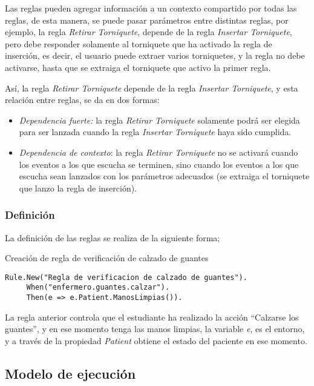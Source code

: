 Las reglas pueden agregar información a un contexto compartido por todas las
reglas, de esta manera, se puede pasar parámetros entre distintas reglas, por
ejemplo, la regla \emph{Retirar Torniquete}, depende de la regla \emph{Insertar
Torniquete}, pero debe responder solamente al torniquete que ha activado
la regla de inserción, es decir, el usuario puede extraer varios torniquetes, y
la regla no debe activarse, hasta que se extraiga el torniquete que activo la
primer regla.

Así, la regla \emph{Retirar Torniquete} depende de la regla \emph{Insertar
Torniquete}, y esta relación entre reglas, se da en dos
formas\cite{bailey2004event}:

\begin{itemize}
\item  \emph{Dependencia fuerte:} la regla \emph{Retirar Torniquete} solamente podrá
	ser elegida para ser lanzada cuando la regla \emph{Insertar Torniquete}
	haya sido cumplida.
\item  \emph{Dependencia de contexto}: la regla \emph{Retirar Torniquete} no se
	activará cuando los eventos a los que escucha se terminen, sino cuando
	los eventos a los que escucha sean lanzados con los parámetros adecuados
	(se extraiga el torniquete que lanzo la regla de inserción).
\end{itemize}

\subsubsection{Definición}

La definición de las reglas se realiza de la siguiente forma;
\begin{algorithm}[H]
\caption{Creación de regla de verificación de calzado de guantes}
\label{alg:rule:guante}
\lstset{style=sharpc}
\begin{lstlisting}
Rule.New("Regla de verificacion de calzado de guantes").
     When("enfermero.guantes.calzar").
     Then(e => e.Patient.ManosLimpias()).
\end{lstlisting}
\end{algorithm}

La regla anterior controla que el estudiante ha realizado la acción ``Calzarse
los guantes'', y en ese momento tenga las manos limpias, la variable \emph{e},
es el entorno, y a través de la propiedad \emph{Patient} obtiene el estado del
paciente en ese momento.

\subsection{Modelo de ejecución}

